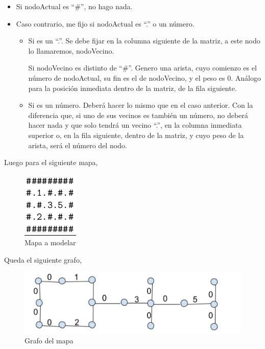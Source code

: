     \begin{itemize}
    	\item Si nodoActual es “\#”, no hago nada.
    	\item Caso contrario, me fijo si nodoActual es “.” o un número.
    	\begin{itemize}
    			\item Si es un “.”. Se debe fijar en la columna siguiente de la matriz, a este nodo lo llamaremos, nodoVecino.\par
 		   		Si nodoVecino es distinto de “\#”. Genero una arista, cuyo comienzo es el número de nodoActual, su fin es el de nodoVecino, y el peso es 0. Análogo para la posición inmediata dentro de la matriz, de la fila siguiente.
  		  		\item Si es un número. Deberá hacer lo mismo que en el caso anterior. Con la diferencia que, si uno de sus vecinos es también un número, no deberá hacer nada y que solo tendrá un vecino “.”, en la columna inmediata superior o, en la fila siguiente, dentro de la matriz, y cuyo peso de la arista, será el número del nodo.
 			   	\end{itemize}
    \end{itemize} 


    Luego para el siguiente mapa,

       	\begin{figure}[H]
		\begin{center}
			\includegraphics{imagenes/altoMapa.png}
			\caption{Mapa a modelar}
		\end{center}
	\end{figure}


    Queda el siguiente grafo,
    
   	\begin{figure}[H]
		\begin{center}
			\includegraphics[scale=0.5]{imagenes/grafoOK.png}
			\caption{Grafo del mapa}
		\end{center}
	\end{figure}


